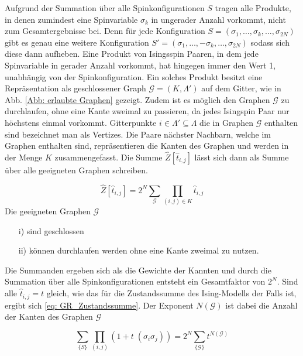 \noindent Aufgrund der Summation über alle Spinkonfigurationen $S$ tragen alle Produkte, in denen zumindest eine Spinvariable $\sigma_k$ in ungerader Anzahl vorkommt, nicht zum Gesamtergebnisse bei. Denn für jede Konfiguration $S = (\sigma_1, \dots, \sigma_k, \dots, \sigma_{2N})$ gibt es genau eine weitere Konfiguration $S' = (\sigma_1, \dots, -\sigma_k, \dots, \sigma_{2N})$ sodass sich diese dann aufheben. Eine Produkt von Isingsspin Paaren, in dem jede Spinvariable in gerader Anzahl vorkommt, hat hingegen immer den Wert 1, unabhängig von der Spinkonfiguration. Ein solches Produkt besitzt eine Repräsentation als geschlossener Graph $\mathcal{G}=(K,\Lambda')$ auf dem Gitter, wie in Abb. \ref{Abb: erlaubte Graphen} gezeigt. Zudem ist es möglich den Graphen $\mathcal{G}$ zu durchlaufen, ohne eine Kante zweimal zu passieren, da jedes Isingspin Paar nur höchstens einmal vorkommt. Gitterpunkte $i\in\Lambda'\subseteq\Lambda$ die in Graphen $\mathcal G$ enthalten sind bezeichnet man als Vertizes. Die Paare nächster Nachbarn, welche im Graphen enthalten sind, repräsentieren die Kanten des Graphen und werden in der Menge $K$ zusammengefasst. Die Summe $\hat{Z}[\hat{t}_{i,j}]$ lässt sich dann als Summe über alle geeigneten Graphen schreiben. 
\begin{grayframe}[frametitle = {Graphische Representation der Summe $\hat{Z}[\hat{t}_{i,j}]$} ]
\begin{equation} \label{eq: GR_pseudoZustanssumme}
\hat{Z}[\hat{t}_{i,j}] = 2^N \sum_{\mathcal G} \prod_{(i,j)\in K} \hat{t}_{i,j}
\end{equation} Die geeigneten Graphen $\mathcal G$ 
\begin{itemize}
\item[i)] sind geschlossen
\item[ii)] können durchlaufen werden ohne eine Kante zweimal zu nutzen.
\end{itemize}
\end{grayframe}

\noindent Die Summanden ergeben sich als die Gewichte der Kannten und durch die Summation über alle Spinkonfigurationen entsteht ein Gesamtfaktor von $2^N$. Sind alle $\hat{t}_{i,j} = t$ gleich, wie das für die Zustandssumme des Ising-Modells der Falls ist, ergibt sich \eqref{eq: GR_Zustandssumme}. Der Exponent $N(\mathcal G)$ ist dabei die Anzahl der Kanten des Graphen $\mathcal G$

\begin{equation} \label{eq: GR_Zustandssumme}
\sum_{\{S\}} \prod_{(i,j)} (1 +  t \; (\sigma_i \sigma_j)) = 2^N \sum_{\{ \mathcal G\}} t^{N(\mathcal G)}
\end{equation}

